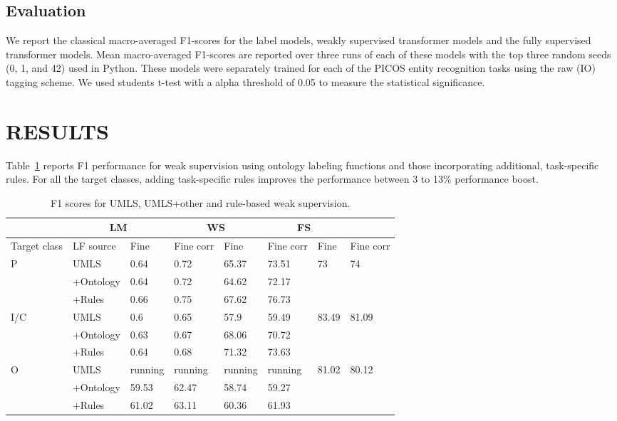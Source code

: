 \documentclass[10.7pt,]{article}
\begin{document}
\subsection{Evaluation}\label{eval}
%
We report the classical macro-averaged F1-scores for the label models, weakly supervised transformer models and the fully supervised transformer models.
Mean macro-averaged F1-scores are reported over three runs of each of these models with the top three random seeds (0, 1, and 42) used in Python.
These models were separately trained for each of the PICOS entity recognition tasks using the raw (IO) tagging scheme.
We used students t-test with a alpha threshold of 0.05 to measure the statistical significance.
%
%
%
\section{RESULTS}\label{results}
%
Table~\ref{tab:res} reports F1 performance for weak supervision using ontology labeling functions and those incorporating additional, task-specific rules.
For all the target classes, adding task-specific rules improves the performance between 3 to 13\% performance boost. 

\begin{table}[!ht]
    \centering
    \begin{tabular}{|l|l|l|l|l|l|l|l|}
        \hline
        \Xhline{1pt}
        \multicolumn{2}{|c|}{Model} & \multicolumn{2}{|c|}{LM} & \multicolumn{2}{|c|}{WS} & \multicolumn{2}{|c|}{FS} \\ \hline
        Target class & LF source & Fine & Fine corr & Fine & Fine corr & Fine & Fine corr \\
        \hline
        \Xhline{1pt}
        P & UMLS & 0.64 & 0.72 & 65.37 & 73.51 & 73 & 74 \\ 
        ~ & +Ontology & 0.64 & 0.72 & 64.62 & 72.17 & ~ & ~ \\ 
        ~ & +Rules & 0.66 & 0.75 & 67.62 & 76.73 & ~ & ~ \\ 
        I/C & UMLS & 0.6 & 0.65 & 57.9 & 59.49 & 83.49 & 81.09 \\ 
        ~ & +Ontology & 0.63 & 0.67 & 68.06 & 70.72 & ~ & ~ \\ 
        ~ & +Rules & 0.64 & 0.68 & 71.32 & 73.63 & ~ & ~ \\ 
        O & UMLS & running & running & running & running & 81.02 & 80.12 \\ 
        ~ & +Ontology & 59.53 & 62.47 & 58.74 & 59.27 & ~ & ~ \\ 
        ~ & +Rules & 61.02 & 63.11 & 60.36 & 61.93 & ~ & ~ \\ \hline
    \end{tabular}
    \caption{\label{tab:res} F1 scores for UMLS, UMLS+other and rule-based weak supervision.}
\end{table}
\end{document}
